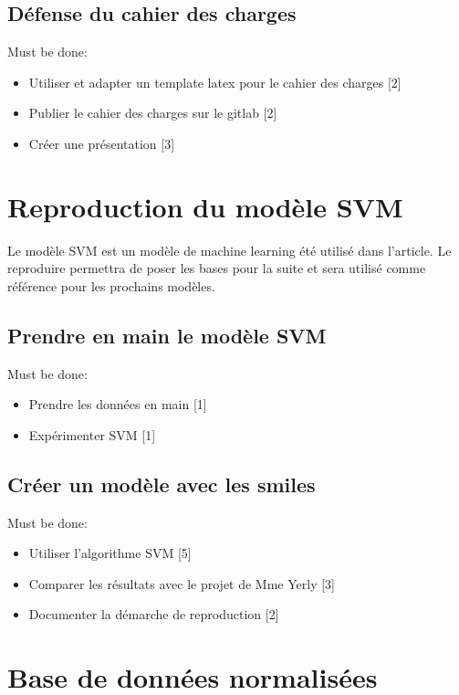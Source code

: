       \subsection*{Défense du cahier des charges}
         Must be done:
         \begin{itemize}
            \item Utiliser et adapter un template latex pour le cahier des charges [2]
            \item Publier le cahier des charges sur le gitlab [2]
            \item Créer une présentation [3]
         \end{itemize}
         
         \section{Reproduction du modèle SVM}
         \label{sec:svm}
         
         Le modèle SVM est un modèle de machine learning été utilisé dans l'article. Le reproduire permettra de poser les bases pour la suite et sera utilisé comme référence pour les prochains modèles.

         \subsection*{Prendre en main le modèle SVM}
            Must be done:
            \begin{itemize}
               \item Prendre les données en main [1]
               \item Expérimenter SVM [1]
            \end{itemize}
         \subsection*{Créer un modèle avec les \acrshort{smiles}}
            Must be done:
            \begin{itemize}
               \item Utiliser l'algorithme SVM [5]
               \item Comparer les résultats avec le projet de Mme Yerly [3]
               \item Documenter la démarche de reproduction [2]
            \end{itemize}

   \section{Base de données normalisées}
   \label{sec:base}

